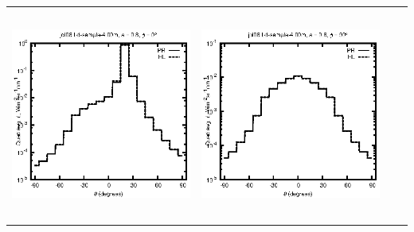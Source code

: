 \begin{tabular}{c c c c}
\includegraphics[height=7cm]{../eps/jol08_Ld_sample_4.00m_fwd.eps} &
\includegraphics[height=7cm]{../eps/jol08_Ld_sample_4.00m_cross.eps} \\
\end{tabular}

\pagebreak

